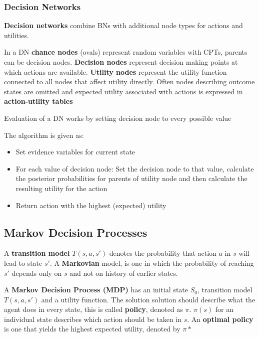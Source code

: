 \documentclass{article}
\begin{document}
\subsubsection{Decision Networks}

\textbf{Decision networks} combine BNs with additional node types for actions and utilities. 

In a DN \textbf{chance nodes} (ovals) represent random variables with CPTs, parents can be decision nodes. \textbf{Decision nodes} represent decision making points at which actions are available. \textbf{Utility nodes} represent the utility function connected to all nodes that affect utility directly. Often nodes describing outcome states are omitted and expected utility associated with actions is expressed in \textbf{action-utility tables}

Evaluation of a DN works by setting decision node to every possible value

The algorithm is given as:
\begin{itemize}
    \item Set evidence variables for current state
    \item For each value of decision node: Set the decision node to that value, calculate the posterior probabilities for parents of utility node and then calculate the resulting utility for the action
    \item Return action with the highest (expected) utility
\end{itemize}

\subsection{Markov Decision Processes}

A \textbf{transition model} $T(s,a,s')$ denotes the probability that action $a$ in $s$ will lead to state $s'$. A \textbf{Markovian} model, is one in which the probability of reaching $s'$ depends only on $s$ and not on history of earlier states. \newline

A \textbf{Markov Decision Process (MDP)} has an initial state $S_0$, transition model $T(s,a,s')$ and a utility function. The solution solution should describe what the agent does in every state, this is called \textbf{policy}, denoted as $\pi$. $\pi(s)$ for an individual state describes which action should be taken in $s$. An \textbf{optimal policy} is one that yields the highest expected utility, denoted by $\pi*$ \newline
\end{document}
